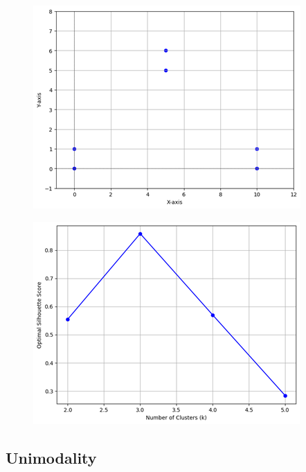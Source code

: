 \documentclass{article}
\begin{document}
\begin{figure}[htbp]
    \centering
    \begin{minipage}{0.45\linewidth}
        \centering
        \includegraphics[width=\linewidth]{triangleex.png}
        \label{fig:1}
    \end{minipage}
    \hfill 
    \begin{minipage}{0.45\linewidth}
        \centering
        \includegraphics[width=\linewidth]{trianglesil.png}
        \label{fig:2}
    \end{minipage}
\end{figure}

\subsection*{Unimodality}
\end{document}
